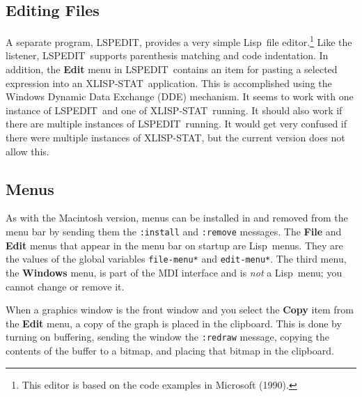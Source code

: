 \documentclass[11pt]{article}
\newcommand{\macbold}[1]{{\bf #1}}
\newcommand{\dcode}[1]{{\tt #1}}
\newcommand{\LS}{Lisp}
\newcommand{\XLS}{XLISP-STAT}
\newcommand{\LSE}{LSPEDIT}
\begin{document}
\subsection{Editing Files}
A separate program, \LSE, provides a very simple \LS\ file
editor.\footnote{This editor is based on the code examples in
Microsoft (1990).} Like the listener, \LSE\ supports parenthesis
matching and code indentation. In addition, the \macbold{Edit} menu in
\LSE\ contains an item for pasting a selected expression into an \XLS\
application. This is accomplished using the Windows Dynamic Data
Exchange (DDE) mechanism. It seems to work with one instance of \LSE\
and one of \XLS\ running. It should also work if there are multiple
instances of \LSE\ running.  It would get very confused if there were
multiple instances of \XLS, but the current version does not allow
this.

\subsection{Menus}
As with the Macintosh version, menus can be installed in and removed
from the menu bar by sending them the \dcode{:install} and
\dcode{:remove} messages. The \macbold{File} and \macbold{Edit} menus
that appear in the menu bar on startup are \LS\ menus. They are the
values of the global variables \dcode{*file-menu*} and
\dcode{*edit-menu*}. The third menu, the \macbold{Windows} menu, is
part of the MDI interface and is {\em not}\/ a \LS\ menu; you cannot
change or remove it.

When a graphics window is the front window and you select the
\macbold{Copy} item from the \macbold{Edit} menu, a copy of the graph
is placed in the clipboard. This is done by turning on buffering,
sending the window the \dcode{:redraw} message, copying the contents
of the buffer to a bitmap, and placing that bitmap in the clipboard.
\end{document}
